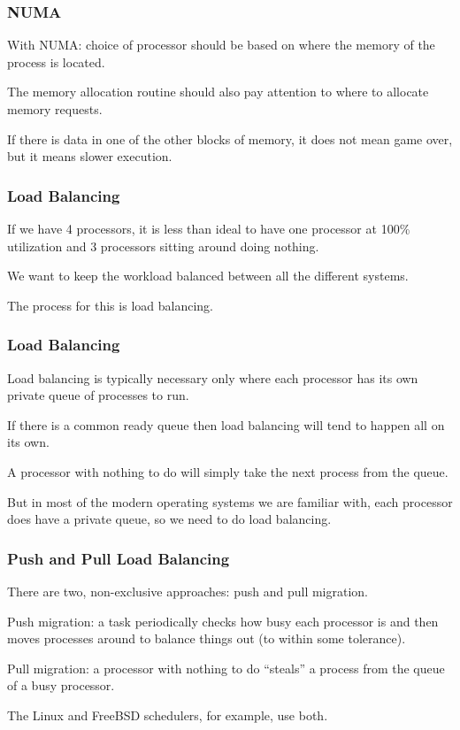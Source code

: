 \begin{frame}
\frametitle{NUMA}

With NUMA: choice of processor should be based on where the memory of the process is located.

The memory allocation routine should also pay attention to where to allocate memory requests.
  
If there is data in one of the other blocks of memory, it does not mean game over, but it means slower execution.

\end{frame}

\begin{frame}
\frametitle{Load Balancing}

If we have 4 processors, it is less than ideal to have one processor at 100\% utilization and 3 processors sitting around doing nothing. 

We want to keep the workload balanced between all the different systems. 

The process for this is \alert{load balancing}.

\end{frame}

\begin{frame}
\frametitle{Load Balancing}

Load balancing is typically necessary only where each processor has its own private queue of processes to run. 

If there is a common ready queue then load balancing will tend to happen all on its own.

A processor with nothing to do will simply take the next process from the queue. 

But in most of the modern operating systems we are familiar with, each processor does have a private queue, so we need to do load balancing.

\end{frame}

\begin{frame}
\frametitle{Push and Pull Load Balancing}

There are two, non-exclusive approaches: \alert{push} and \alert{pull} migration. 


Push migration: a task periodically checks how busy each processor is and then moves processes around to balance things out (to within some tolerance). 

Pull migration: a processor with nothing to do ``steals'' a process from the queue of a busy processor. 

The Linux and FreeBSD schedulers, for example, use both.

\end{frame}

